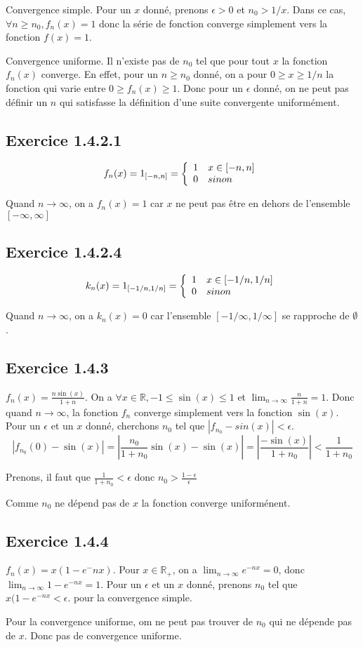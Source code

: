 \documentclass[]{book}
\theoremstyle{definition}
\newcommand{\bb}[1]{\mathbb{#1}}
\newcommand{\R}{\bb{R}}
\begin{document}
Convergence simple. Pour un $x$ donn\'e, prenons  $\epsilon > 0$ et $n_0 > 1/x$. Dans ce cas, $\forall n \geq n_0, f_n(x) = 1$ donc la s\'erie de fonction converge simplement vers la fonction $f(x) = 1$.

Convergence uniforme. Il n'existe pas de $n_0$ tel que pour tout $x$ la fonction $f_n(x)$ converge. En effet, pour un $n \geq n_0$ donn\'e, on a pour $0 \geq x \geq 1/n$ la fonction qui varie entre $0 \geq f_n(x) \geq 1$. Donc pour un $\epsilon$ donn\'e, on ne peut pas d\'efinir un $n$ qui satisfasse la d\'efinition d'une suite convergente uniform\'ement.   

\subsection*{Exercice 1.4.2.1}
$$
f_n(x) = 1_{[-n, n]} = 
\left\{
\begin{array}{l l}
1 & x \in [-n,n] \\
0 & sinon
\end{array}
\right.
$$

Quand $n \to \infty$, on a $f_n(x) = 1$ car $x$ ne peut pas \^etre en dehors de l'ensemble $[-\infty, \infty]$


\subsection*{Exercice 1.4.2.4}
$$
k_n(x) = 1_{[-1/n, 1/n]} = 
\left\{
\begin{array}{l l}
1 & x \in [-1/n,1/n] \\
0 & sinon
\end{array}
\right.
$$

Quand $n \to \infty$, on a $k_n(x) = 0$ car l'ensemble $[-1/\infty, 1/\infty]$ se rapproche de $\emptyset$.

\subsection*{Exercice 1.4.3}
$f_n(x) = \frac{n \sin(x)}{1+n}$. On a $\forall x \in \R, -1 \leq \sin(x) \leq 1$ et $\lim_{n \to \infty} {\frac{n}{1+n}} = 1$. Donc quand $n \to \infty$, la fonction $f_n$ converge simplement vers la fonction $\sin(x)$. Pour un $\epsilon$ et un $x$ donn\'e, cherchons $n_0$ tel que $|f_{n_0}-sin(x)|<\epsilon$. 
$$
|f_{n_0}(0)-\sin(x)| = \left|\frac{n_0}{1+n_0}\sin(x)-\sin(x)\right| = \left|\frac{-\sin(x)}{1+n_0}\right| < \frac{1}{1+n_0}
$$

Prenons, il faut que $\frac{1}{1+n_0} < \epsilon$ donc $n_0 > \frac{1-\epsilon}{\epsilon}$

Comme $n_0$ ne d\'epend pas de $x$ la fonction converge uniform\'enent.

\subsection*{Exercice 1.4.4}
$f_n(x) = x(1-e^-{nx})$. Pour $x \in \R_{+}$, on a $\lim_{n \to \infty}{ e^{-nx}} = 0$, donc $\lim_{n \to \infty}{1 - e^{-nx}} = 1$. Pour un $\epsilon$ et un $x$ donn\'e, prenons $n_0$ tel que $x(1-e^{-nx}<\epsilon$. pour la convergence simple.

Pour la convergence uniforme, om ne peut pas trouver de $n_0$ qui ne d\'epende pas de $x$. Donc pas de convergence uniforme.
\end{document}
